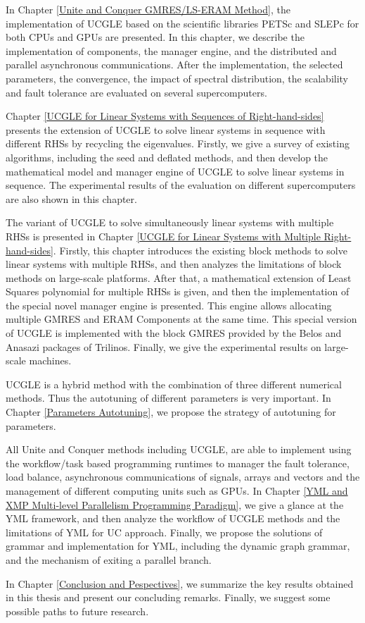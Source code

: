 In Chapter \ref{Unite and Conquer GMRES/LS-ERAM Method}, the implementation of UCGLE based on the scientific libraries PETSc and SLEPc for both CPUs and GPUs are presented. In this chapter, we describe the implementation of components, the manager engine, and the distributed and parallel asynchronous communications. After the implementation, the selected parameters, the convergence, the impact of spectral distribution, the scalability and fault tolerance are evaluated on several supercomputers.

Chapter \ref{UCGLE for Linear Systems with Sequences of Right-hand-sides} presents the extension of UCGLE to solve linear systems in sequence with different RHSs by recycling the eigenvalues. Firstly, we give a survey of existing algorithms, including the seed and deflated methods, and then develop the mathematical model and manager engine of UCGLE to solve linear systems in sequence. The experimental results of the evaluation on different supercomputers are also shown in this chapter.

The variant of UCGLE to solve simultaneously linear systems with multiple RHSs is presented in Chapter \ref{UCGLE for Linear Systems with Multiple Right-hand-sides}. Firstly, this chapter introduces the existing block methods to solve linear systems with multiple RHSs, and then analyzes the limitations of block methods on large-scale platforms. After that, a mathematical extension of Least Squares polynomial for multiple RHSs is given, and then the implementation of the special novel manager engine is presented. This engine allows allocating multiple GMRES and ERAM Components at the same time. This special version of UCGLE is implemented with the block GMRES provided by the Belos and Anasazi packages of Trilinos. Finally, we give the experimental results on large-scale machines.

UCGLE is a hybrid method with the combination of three different numerical methods. Thus the autotuning of different parameters is very important. In Chapter \ref{Parameters Autotuning}, we propose the strategy of autotuning for parameters. %

All Unite and Conquer methods including UCGLE, are able to implement using the workflow/task based programming runtimes to manager the fault tolerance, load balance, asynchronous communications of signals, arrays and vectors and the management of different computing units such as GPUs. In Chapter \ref{YML and XMP Multi-level Parallelism Programming Paradigm}, we give a glance at the YML framework, and then analyze the workflow of UCGLE methods and the limitations of YML for UC approach. Finally, we propose the solutions of grammar and implementation for YML, including the dynamic graph grammar, and the mechanism of exiting a parallel branch.

In Chapter \ref{Conclusion and Pespectives}, we summarize the key results obtained in this thesis and present our concluding remarks. Finally, we suggest some possible paths to future research.
